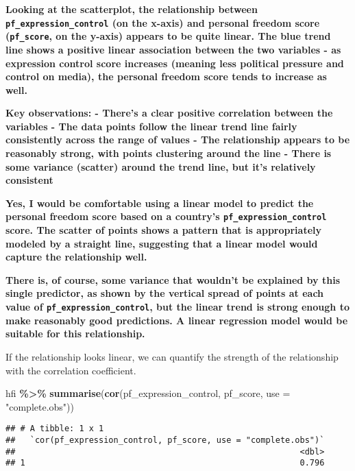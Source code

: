 \documentclass[
]{article}
\newenvironment{Shaded}{\begin{snugshade}}{\end{snugshade}}
\newcommand{\AttributeTok}[1]{\textcolor[rgb]{0.13,0.29,0.53}{#1}}
\newcommand{\FunctionTok}[1]{\textcolor[rgb]{0.13,0.29,0.53}{\textbf{#1}}}
\newcommand{\NormalTok}[1]{#1}
\newcommand{\SpecialCharTok}[1]{\textcolor[rgb]{0.81,0.36,0.00}{\textbf{#1}}}
\newcommand{\StringTok}[1]{\textcolor[rgb]{0.31,0.60,0.02}{#1}}
\begin{document}
\textbf{Looking at the scatterplot, the relationship between
\texttt{pf\_expression\_control} (on the x-axis) and personal freedom
score (\texttt{pf\_score}, on the y-axis) appears to be quite linear.
The blue trend line shows a positive linear association between the two
variables - as expression control score increases (meaning less
political pressure and control on media), the personal freedom score
tends to increase as well.}

\textbf{Key observations: - There's a clear positive correlation between
the variables - The data points follow the linear trend line fairly
consistently across the range of values - The relationship appears to be
reasonably strong, with points clustering around the line - There is
some variance (scatter) around the trend line, but it's relatively
consistent}

\textbf{Yes, I would be comfortable using a linear model to predict the
personal freedom score based on a country's
\texttt{pf\_expression\_control} score. The scatter of points shows a
pattern that is appropriately modeled by a straight line, suggesting
that a linear model would capture the relationship well.}

\textbf{There is, of course, some variance that wouldn't be explained by
this single predictor, as shown by the vertical spread of points at each
value of \texttt{pf\_expression\_control}, but the linear trend is
strong enough to make reasonably good predictions. A linear regression
model would be suitable for this relationship.}

If the relationship looks linear, we can quantify the strength of the
relationship with the correlation coefficient.

\begin{Shaded}
\begin{Highlighting}[]
\NormalTok{hfi }\SpecialCharTok{\%\textgreater{}\%}
  \FunctionTok{summarise}\NormalTok{(}\FunctionTok{cor}\NormalTok{(pf\_expression\_control, pf\_score, }\AttributeTok{use =} \StringTok{"complete.obs"}\NormalTok{))}
\end{Highlighting}
\end{Shaded}

\begin{verbatim}
## # A tibble: 1 x 1
##   `cor(pf_expression_control, pf_score, use = "complete.obs")`
##                                                          <dbl>
## 1                                                        0.796
\end{verbatim}
\end{document}
